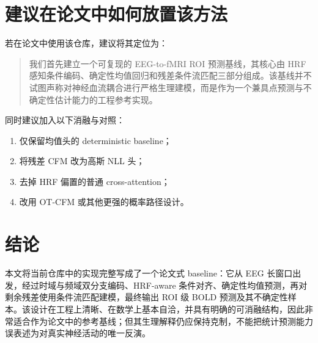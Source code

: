 \documentclass[11pt,a4paper]{ctexart}
\begin{document}
\section{建议在论文中如何放置该方法}

若在论文中使用该仓库，建议将其定位为：
\begin{quote}
我们首先建立一个可复现的 EEG-to-fMRI ROI 预测基线，其核心由 HRF 感知条件编码、确定性均值回归和残差条件流匹配三部分组成。该基线并不试图声称对神经血流耦合进行严格生理建模，而是作为一个兼具点预测与不确定性估计能力的工程参考实现。
\end{quote}

同时建议加入以下消融与对照：
\begin{enumerate}
  \item 仅保留均值头的 deterministic baseline；
  \item 将残差 CFM 改为高斯 NLL 头；
  \item 去掉 HRF 偏置的普通 cross-attention；
  \item 改用 OT-CFM 或其他更强的概率路径设计。
\end{enumerate}

\section{结论}

本文将当前仓库中的实现完整写成了一个论文式 baseline：它从 EEG 长窗口出发，经过时域与频域双分支编码、HRF-aware 条件对齐、确定性均值预测，再对剩余残差使用条件流匹配建模，最终输出 ROI 级 BOLD 预测及其不确定性样本。该设计在工程上清晰、在数学上基本自洽，并具有明确的可消融结构，因此非常适合作为论文中的参考基线；但其生理解释仍应保持克制，不能把统计预测能力误表述为对真实神经活动的唯一反演。
\end{document}
